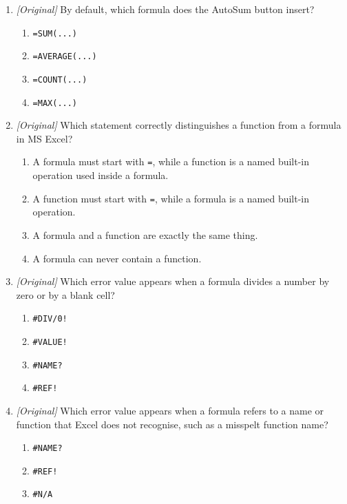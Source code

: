 \begin{enumerate}[label=\textbf{Q\arabic*.}, leftmargin=*]
\begin{enumerate}[label=\Alph*.]
    \item \texttt{Ctrl + =}
    \item \texttt{Shift + F3}
    \item \texttt{Ctrl + S}
  \end{enumerate}
\item \textit{[Original]} By default, which formula does the AutoSum button
  insert?
  \begin{enumerate}[label=\Alph*.]
    \item \texttt{=SUM(...)}
    \item \texttt{=AVERAGE(...)}
    \item \texttt{=COUNT(...)}
    \item \texttt{=MAX(...)}
  \end{enumerate}
\item \textit{[Original]} Which statement correctly distinguishes a function
  from a formula in MS Excel?
  \begin{enumerate}[label=\Alph*.]
    \item A formula must start with \texttt{=}, while a function is a named
      built-in operation used inside a formula.
    \item A function must start with \texttt{=}, while a formula is a named
      built-in operation.
    \item A formula and a function are exactly the same thing.
    \item A formula can never contain a function.
  \end{enumerate}
\item \textit{[Original]} Which error value appears when a formula divides a
  number by zero or by a blank cell?
  \begin{enumerate}[label=\Alph*.]
    \item \texttt{\#DIV/0!}
    \item \texttt{\#VALUE!}
    \item \texttt{\#NAME?}
    \item \texttt{\#REF!}
  \end{enumerate}
\item \textit{[Original]} Which error value appears when a formula refers to a
  name or function that Excel does not recognise, such as a misspelt function
  name?
  \begin{enumerate}[label=\Alph*.]
    \item \texttt{\#NAME?}
    \item \texttt{\#REF!}
    \item \texttt{\#N/A}

\end{enumerate}
\end{enumerate}
